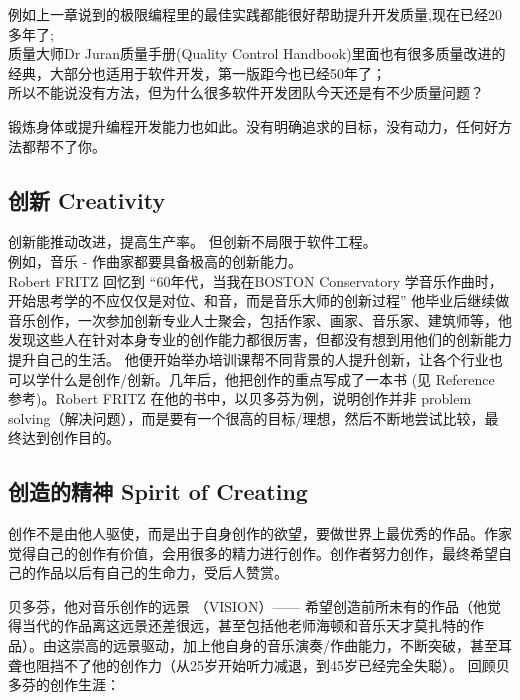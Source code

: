 例如上一章说到的极限编程里的最佳实践都能很好帮助提升开发质量,现在已经20多年了;\\
质量大师Dr Juran质量手册(Quality Control
Handbook)里面也有很多质量改进的经典，大部分也适用于软件开发，第一版距今也已经50年了；\\
所以不能说没有方法，但为什么很多软件开发团队今天还是有不少质量问题？

锻炼身体或提升编程开发能力也如此。没有明确追求的目标，没有动力，任何好方法都帮不了你。

\hypertarget{ux521bux65b0-creativity}{%
\subsection{创新 Creativity}\label{ux521bux65b0-creativity}}

创新能推动改进，提高生产率。 但创新不局限于软件工程。\\
例如，音乐 - 作曲家都要具备极高的创新能力。\\
Robert FRITZ 回忆到 ``60年代，当我在BOSTON Conservatory
学音乐作曲时，开始思考学的不应仅仅是对位、和音，而是音乐大师的创新过程''
他毕业后继续做音乐创作，一次参加创新专业人士聚会，包括作家、画家、音乐家、建筑师等，他发现这些人在针对本身专业的创作能力都很厉害，但都没有想到用他们的创新能力提升自己的生活。
他便开始举办培训课帮不同背景的人提升创新，让各个行业也可以学什么是创作/创新。几年后，他把创作的重点写成了一本书
(见 Reference 参考)。Robert FRITZ 在他的书中，以贝多芬为例，说明创作并非
problem
solving（解决问题），而是要有一个很高的目标/理想，然后不断地尝试比较，最终达到创作目的。

\hypertarget{ux521bux9020ux7684ux7cbeux795e-spirit-of-creating}{%
\subsection{创造的精神 Spirit of
Creating}\label{ux521bux9020ux7684ux7cbeux795e-spirit-of-creating}}

创作不是由他人驱使，而是出于自身创作的欲望，要做世界上最优秀的作品。作家觉得自己的创作有价值，会用很多的精力进行创作。创作者努力创作，最终希望自己的作品以后有自己的生命力，受后人赞赏。

贝多芬，他对音乐创作的远景 （VISION）------
希望创造前所未有的作品（他觉得当代的作品离这远景还差很远，甚至包括他老师海顿和音乐天才莫扎特的作品）。由这崇高的远景驱动，加上他自身的音乐演奏/作曲能力，不断突破，甚至耳聋也阻挡不了他的创作力（从25岁开始听力减退，到45岁已经完全失聪）。
回顾贝多芬的创作生涯：\\



